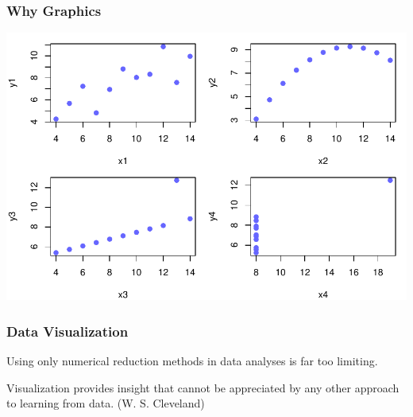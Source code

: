 \documentclass[12pt]{beamer}\usepackage[]{graphicx}\usepackage[]{color}
\newenvironment{knitrout}{}{} %
\begin{document}
\begin{frame}
\begin{center}
\large{
\pause

\bigskip
{}
}
\end{center}
\end{frame}


\begin{frame}[fragile]
\frametitle{Why Graphics}

\begin{knitrout}\footnotesize
{}\color{fgcolor}

{\centering \includegraphics[width=.9\linewidth,height=.7\linewidth]{figure/unnamed-chunk-7-1} 

}



\end{knitrout}

\end{frame}


\begin{frame}
\frametitle{Data Visualization}

Using only numerical reduction methods in data analyses is far too limiting.

\bigskip
Visualization provides insight that cannot be appreciated by any other approach to learning from data. (W. S. Cleveland)

\end{frame}
\end{document}
